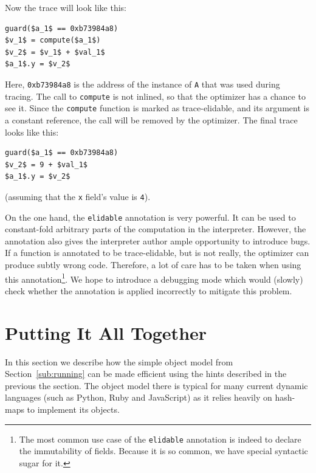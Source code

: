 \documentclass{sigplanconf}
\begin{document}
Now the trace will look like this:
%
\begin{lstlisting}[mathescape,basicstyle=\ttfamily]
guard($a_1$ == 0xb73984a8)
$v_1$ = compute($a_1$)
$v_2$ = $v_1$ + $val_1$
$a_1$.y = $v_2$
\end{lstlisting}

Here, \texttt{0xb73984a8} is the address of the instance of \texttt{A} that was used
during tracing. The call to \texttt{compute} is not inlined, so that the optimizer
has a chance to see it. Since the \texttt{compute} function is marked as trace-elidable, and its
argument
is a constant reference, the call will be removed by the optimizer. The final
trace looks like this:
%
\begin{lstlisting}[mathescape,basicstyle=\ttfamily]
guard($a_1$ == 0xb73984a8)
$v_2$ = 9 + $val_1$
$a_1$.y = $v_2$
\end{lstlisting}

(assuming that the \texttt{x} field's value is \texttt{4}).

On the one hand, the \texttt{elidable} annotation is very powerful. It can be
used to constant-fold arbitrary parts of the computation in the interpreter.
However, the annotation also gives the interpreter author ample opportunity to introduce bugs. If a
function is annotated to be trace-elidable, but is not really, the optimizer can produce
subtly wrong code. Therefore, a lot of care has to be taken when using this
annotation\footnote{The most common use case of the \texttt{elidable}
annotation is indeed to declare the immutability of fields. Because it is so
common, we have special syntactic sugar for it.}. We hope to introduce a
debugging mode which would (slowly) check whether the annotation is applied
incorrectly to mitigate this problem.



\section{Putting It All Together}
\label{sec:fastobjmodel}

In this section we describe how the simple object model from
Section~\ref{sub:running} can be made efficient using the hints described in the
previous the section. The object model there is typical for many current
dynamic languages (such as Python, Ruby and JavaScript) as it relies heavily on
hash-maps to implement its objects.

\end{document}
